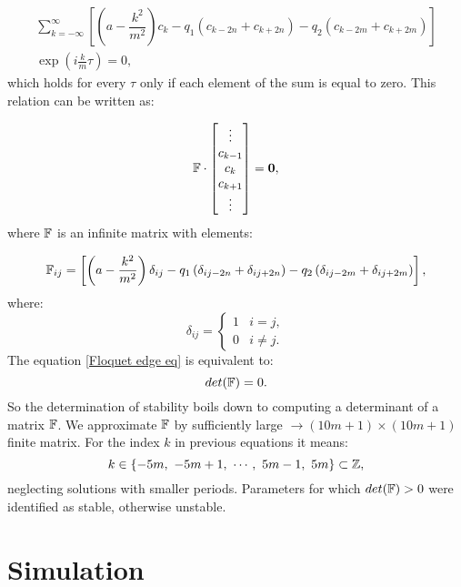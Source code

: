 \begin{multline}
	\sum_{k=-\infty}^{\infty}\left[ \left(a - \dfrac{k^2}{m^2} \right)c_k - q_1 \left(c_{k-2n} + c_{k+2n} \right) - q_2 \left(c_{k-2m} + c_{k+2m} \right)  \right] \\ \exp(i\frac{k}{m}\tau) = 0,
\end{multline}
which holds for every $\tau$ only if each element of the sum is equal to zero. This relation can be written as:

\begin{equation}
	\label{Floquet edge eq}
	\mathbb{F} \cdot \begin{bmatrix}
	\vdots \\
	c_{k-1} \\
	c_{k} \\
	c_{k+1} \\
	\vdots
	\end{bmatrix} = \vb{0},
\end{equation}
where $\mathbb{F}$ is an infinite matrix with elements:

\begin{equation}
	\mathbb{F}_{i j} = \left[ \left(a - \dfrac{k^2}{m^2} \right)\delta_{i j} - q_1 \left(\delta_{i j-2n} + \delta_{i j+2n} \right) - q_2 \left(\delta_{i j-2m} + \delta_{i j+2m} \right)  \right],
\end{equation} 
where:
\begin{equation}
	\delta_{ij} = 
	\begin{cases}
		1 & i=j, \\
		0 & i \neq j.
	\end{cases}	
\end{equation}
The equation \eqref{Floquet edge eq} is equivalent to:
\begin{equation}
	\label{Floquet determinant}
	det(\mathbb{F}) = 0.
\end{equation}
So the determination of stability boils down to computing a determinant of a matrix $\mathbb{F}$. We approximate $\mathbb{F}$ by sufficiently large $\rightarrow (10m+1) \times (10m+1)$ finite matrix. For the index $k$ in previous equations it means: $$k \in \{ -5m, \ -5m+1, \  \cdots, \ 5m-1, \ 5m \} \subset \mathbb{Z},$$ neglecting solutions with smaller periods. Parameters for which $det(\mathbb{F}) > 0$ were identified as stable, otherwise unstable.
 	
\section{Simulation}
\label{sec:simulation}

